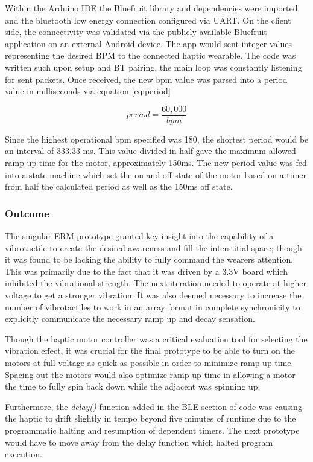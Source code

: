     Within the Arduino IDE the Bluefruit library and dependencies were imported and the bluetooth low energy connection configured via UART. On the client side, the connectivity was validated via the publicly available Bluefruit application on an external Android device. The app would sent integer values representing the desired BPM to the connected haptic wearable. The code was written such upon setup and BT pairing, the main loop was constantly listening for sent packets. Once received, the new bpm value was parsed into a period value in milliseconds via equation \ref{eq:period}

    \begin{equation}
        \label{eq:period}
        period = \frac{60,000}{bpm}
    \end{equation}

    Since the highest operational bpm specified was 180, the shortest period would be an interval of 333.33 ms. This value divided in half gave the maximum allowed ramp up time for the motor, approximately 150ms. The new period value was fed into a state machine which set the on and off state of the motor based on a timer from half the calculated period as well as the 150ms off state.

    \subsubsection{Outcome}
    The singular ERM prototype granted key insight into the capability of a vibrotactile to create the desired awareness and fill the interstitial space; though it was found to be lacking the ability to fully command the wearers attention. This was primarily due to the fact that it was driven by a 3.3V board which inhibited the vibrational strength. The next iteration needed to operate at higher voltage to get a stronger vibration. It was also deemed necessary to increase the number of vibrotactiles to work in an array format in complete synchronicity to explicitly communicate the necessary ramp up and decay sensation. 
    
    Though the haptic motor controller was a critical evaluation tool for selecting the vibration effect, it was crucial for the final prototype to be able to turn on the motors at full voltage as quick as possible in order to minimize ramp up time. Spacing out the motors would also optimize ramp up time in allowing a motor the time to fully spin back down while the adjacent was spinning up.

    Furthermore, the \textit{delay()} function added in the BLE section of code was causing the haptic to drift slightly in tempo beyond five minutes of runtime due to the programmatic halting and resumption of dependent timers. The next prototype would have to move away from the delay function which halted program execution.

